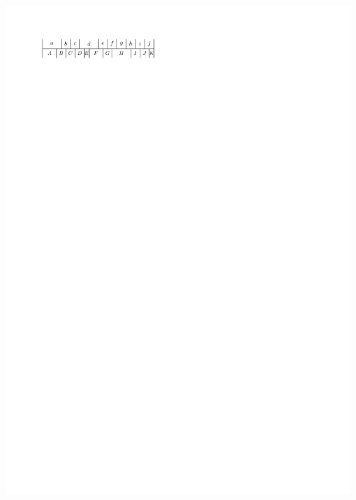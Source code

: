 \documentclass[a4paper]{article}
\begin{document}
\includegraphics[width=\textwidth]{./introduction/img/10sidedBefore.pdf}
\clearpage%
\end{document}
